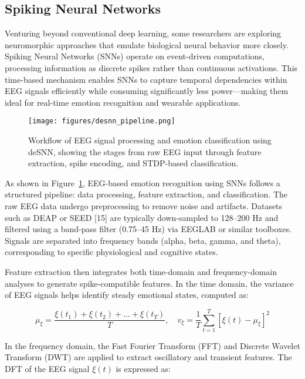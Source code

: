 \documentclass[conference]{IEEEtran}
\begin{document}
\subsection{Spiking Neural Networks}
Venturing beyond conventional deep learning, some researchers are exploring neuromorphic approaches that emulate biological neural behavior more closely. Spiking Neural Networks (SNNs) \cite{Luo2020SNN_EEGEmotion} operate on event-driven computations, processing information as discrete spikes rather than continuous activations. This time-based mechanism enables SNNs to capture temporal dependencies within EEG signals efficiently while consuming significantly less power—making them ideal for real-time emotion recognition and wearable applications.

\begin{figure}[H]
    \centering
    \texttt{[image: figures/desnn\_pipeline.png]}
    \caption{Workflow of EEG signal processing and emotion classification using deSNN, showing the stages from raw EEG input through feature extraction, spike encoding, and STDP-based classification.}
    \label{fig:desnn_pipeline}
\end{figure}

As shown in Figure~\ref{fig:desnn_pipeline}, EEG-based emotion recognition using SNNs follows a structured pipeline: data processing, feature extraction, and classification. The raw EEG data undergo preprocessing to remove noise and artifacts. Datasets such as DEAP or SEED [15] are typically down-sampled to 128–200 Hz and filtered using a band-pass filter (0.75–45 Hz) via EEGLAB or similar toolboxes. Signals are separated into frequency bands (alpha, beta, gamma, and theta), corresponding to specific physiological and cognitive states.

Feature extraction then integrates both time-domain and frequency-domain analyses to generate spike-compatible features. In the time domain, the variance of EEG signals helps identify steady emotional states, computed as:

\begin{equation}
\mu_{\xi} = \frac{\xi(t_1) + \xi(t_2) + \dots + \xi(t_T)}{T}, \quad
v_{\xi} = \frac{1}{T} \sum_{t=1}^{T} [\xi(t) - \mu_{\xi}]^2
\end{equation}

In the frequency domain, the Fast Fourier Transform (FFT) and Discrete Wavelet Transform (DWT) \cite{Luo2020SNN_EEGEmotion} are applied to extract oscillatory and transient features. The DFT of the EEG signal \( \xi(t) \) is expressed as:
\end{document}
